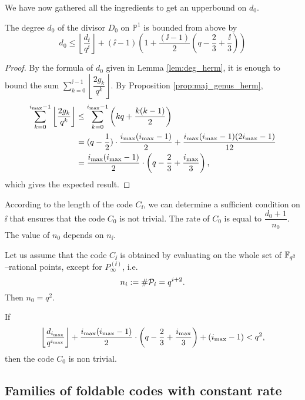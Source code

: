 \documentclass[10pt]{article}
\begin{document}
We have now gathered all the ingredients to get an upperbound on $d_0$.

\begin{corollary}
The degree $d_0$ of the divisor $D_0$ on $\mathbb{P}^1$ is bounded from above by 
\[d_0 \leq \left\lfloor \dfrac{d_{\ii}}{q^{\ii}}\right\rfloor + (\ii-1)\left( 1+\dfrac{(\ii-1)}{2} \left(q-\frac{2}{3} + \frac{\ii}{3}\right) \right) \]
\end{corollary}

\begin{proof}
	By the formula of $d_0$ given in Lemma \ref{lem:deg_herm}, it is enough to bound the sum $\sum\limits_{k=0}^{\ii-1} \left\lfloor \dfrac{2g_k}{q^k}\right\rfloor$. By Proposition \ref{prop:maj_genus_herm},
\begin{align*}
\sum\limits_{k=0}^{i_{\rm{max}}-1} \left\lfloor \dfrac{2g_k}{q^k}\right\rfloor & \leq  \sum\limits_{k=0}^{i_{\rm{max}}-1} \left(kq + \dfrac{k(k-1)}{2}\right)  \\
	&= (q-\frac{1}{2}) \cdot \dfrac{i_{\rm{max}}(i_{\rm{max}}-1)}{2} + \dfrac{i_{\rm{max}}(i_{\rm{max}}-1)(2i_{\rm{max}}-1)}{12} \\
	&= \dfrac{i_{\rm{max}}(i_{\rm{max}}-1)}{2}\cdot \left(q-\frac{2}{3} + \frac{i_{\rm{max}}}{3}\right),
\end{align*}
which gives the expected result.
\end{proof}

According to the length of the code $C_{\ii}$, we can determine a sufficient condition on $\ii$ that ensures that the code $C_0$ is not trivial. The rate of $C_0$ is equal to $\dfrac{d_0+1}{n_0}$. The value of $n_0$ depends on $n_{\ii}$.

Let us assume that the code $C_{\ii}$ is obtained by evaluating on the whole set of $\mathbb{F}_{q^2}$--rational points, except for $P_\infty^{(\ii)}$, i.e. 
\[n_i := \#\mathcal{P}_i = q^{i+2}.\]
Then $n_0=q^2$. 

\begin{corollary}\label{cor:cdt_deg_herm}
If 
\[ \left\lfloor \dfrac{d_{i_{\rm{max}}}}{q^{i_{\rm{max}}}}\right\rfloor + \dfrac{i_{\rm{max}}(i_{\rm{max}}-1)}{2}\cdot \left(q-\frac{2}{3} + \frac{i_{\rm{max}}}{3}\right) + (i_{\rm{max}}-1) < q^2,\]
then the code $C_0$ is non trivial.
\end{corollary}

\subsection{Families of foldable codes with constant rate}

\end{document}
